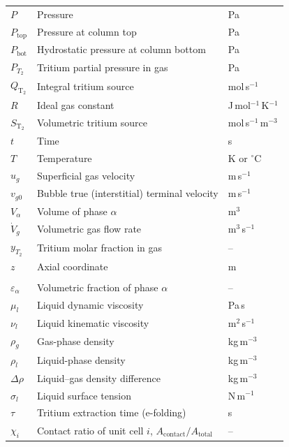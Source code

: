 \begin{xltabular}{\linewidth}{@{}l X l@{}}
$P$            & Pressure                                   & Pa \\
$P_{\mathrm{top}}$ & Pressure at column top                 & Pa \\
$P_{\mathrm{bot}}$ & Hydrostatic pressure at column bottom  & Pa \\
$P_{T_2}$      & Tritium partial pressure in gas            & Pa \\
$Q_\mathrm{T_2}$ & Integral tritium source                  & mol\,s$^{-1}$ \\
$R$            & Ideal gas constant                         & J\,mol$^{-1}$\,K$^{-1}$ \\
$S_\mathrm{T_2}$ & Volumetric tritium source                & mol\,s$^{-1}$\,m$^{-3}$ \\
$t$            & Time                                       & s \\
$T$            & Temperature                                & K or $^\circ$C \\
$u_g$          & Superficial gas velocity                   & m\,s$^{-1}$ \\
$v_{g0}$       & Bubble true (interstitial) terminal velocity & m\,s$^{-1}$ \\
$V_\alpha$     & Volume of phase $\alpha$                   & m$^3$ \\
$\dot V_g$     & Volumetric gas flow rate                   & m$^3$\,s$^{-1}$ \\
$y_{T_2}$      & Tritium molar fraction in gas              & -- \\
$z$            & Axial coordinate                           & m \\

\addlinespace[1em]
 \\
\midrule
$\varepsilon_\alpha$ & Volumetric fraction of phase $\alpha$ & -- \\
$\mu_l$        & Liquid dynamic viscosity                   & Pa\,s \\
$\nu_l$        & Liquid kinematic viscosity                 & m$^2$\,s$^{-1}$ \\
$\rho_g$       & Gas-phase density                          & kg\,m$^{-3}$ \\
$\rho_l$       & Liquid-phase density                       & kg\,m$^{-3}$ \\
$\Delta\rho$   & Liquid--gas density difference             & kg\,m$^{-3}$ \\
$\sigma_l$     & Liquid surface tension                     & N\,m$^{-1}$ \\
$\tau$         & Tritium extraction time (e-folding)        & s \\
$\chi_i$       & Contact ratio of unit cell $i$, $A_\mathrm{contact}/A_\mathrm{total}$ & -- \\


\end{xltabular}

